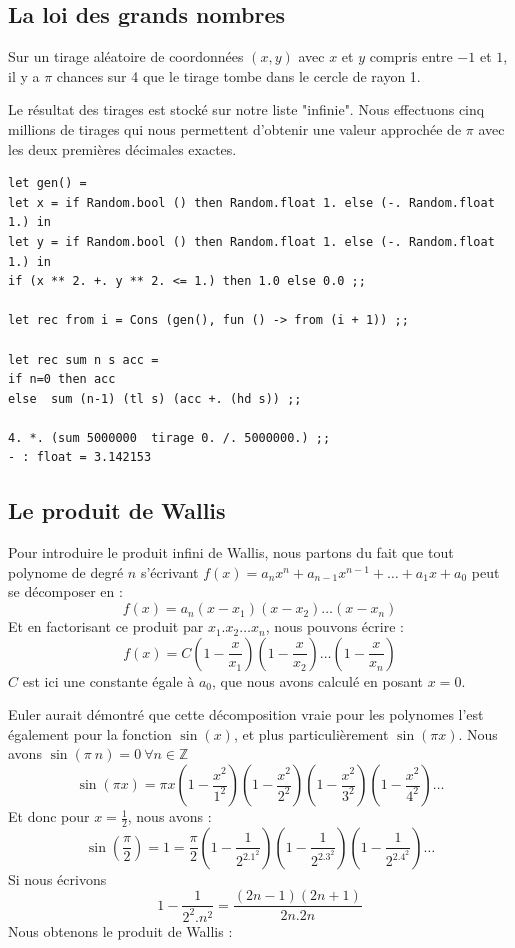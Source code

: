 \subsection{La loi des grands nombres}
Sur un tirage aléatoire de coordonnées $(x,y)$ avec $x$ et $y$ compris entre $-1$ et $1$,
il y a  $\pi$ chances sur 4 que le tirage tombe dans le cercle de rayon 1.
\begin{center}
\vspace{0.5cm}
\end{center} 

Le résultat des tirages est stocké sur notre liste "infinie". Nous effectuons cinq millions de tirages qui nous
permettent d'obtenir une valeur approchée de $\pi$  avec les deux premières décimales exactes.
\begin{verbatim}
let gen() = 
let x = if Random.bool () then Random.float 1. else (-. Random.float 1.) in
let y = if Random.bool () then Random.float 1. else (-. Random.float 1.) in
if (x ** 2. +. y ** 2. <= 1.) then 1.0 else 0.0 ;;

let rec from i = Cons (gen(), fun () -> from (i + 1)) ;;

let rec sum n s acc =
if n=0 then acc
else  sum (n-1) (tl s) (acc +. (hd s)) ;;
  
4. *. (sum 5000000  tirage 0. /. 5000000.) ;;
- : float = 3.142153
\end{verbatim}

\subsection{Le produit de Wallis}
Pour introduire le produit infini de Wallis, nous partons du fait que tout polynome
de degré $n$ s'écrivant $f(x) = a_n x^n + a_{n-1} x^{n-1}+ \dots + a_1 x + a_0$ peut se décomposer en :
$$ f(x) = a_n(x-x_1)(x-x_2)\dots(x-x_n)$$
Et en factorisant ce produit par $x_1.x_2\dots x_n$, nous pouvons écrire :
$$ f(x) = C (1-\frac{x}{x_1})(1-\frac{x}{x_2})\dots(1-\frac{x}{x_n}) $$ 
$C$ est ici une constante égale à $a_0$, que nous avons calculé en posant $x=0$.

Euler aurait démontré que cette décomposition vraie pour les polynomes l'est également pour la fonction $\sin(x)$, et plus
particulièrement $\sin(\pi x)$. Nous avons $\sin(\pi\ n)=0\ \forall n \in \mathbb{Z}$
$$\sin (\pi x) = \pi x (1-\frac{x^2}{1^2})(1-\frac{x^2}{2^2})(1-\frac{x^2}{3^2})(1-\frac{x^2}{4^2})\dots $$
Et donc pour $x=\frac{1}{2}$, nous avons :
$$\sin (\frac{\pi}{2}) = 1 = \frac{\pi}{2} (1-\frac{1}{2^2.1^2}) (1-\frac{1}{2^2.3^2}) (1-\frac{1}{2^2.4^2}) \dots $$
Si nous écrivons 
$$1-\frac{1}{2^2.n^2} = \frac{(2n-1)(2n+1)}{2n.2n} $$
Nous obtenons le produit de Wallis :

